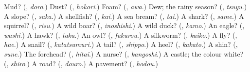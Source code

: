 \begin{tcolorbox}[breakable,colback=teal!4,colframe=teal!35!black,title={Before you move on}]
Mud? (\textbf{}, \emph{doro}.) Dust? (\textbf{}, \emph{hokori}.) Foam? (\textbf{}, \emph{awa}.) Dew; the rainy season? (\textbf{}, \emph{tsuyu}.) A slope? (\textbf{}, \emph{saka}.) A shellfish? (\textbf{}, \emph{kai}.) A sea bream? (\textbf{}, \emph{tai}.) A shark? (\textbf{}, \emph{same}.) A squirrel? (\textbf{}, \emph{risu}.) A wild boar? (\textbf{}, \emph{inoshishi}.) A wild duck? (\textbf{}, \emph{kamo}.) An eagle? (\textbf{}, \emph{washi}.) A hawk? (\textbf{}, \emph{taka}.) An owl? (\textbf{}, \emph{fukurou}.) A silkworm? (\textbf{}, \emph{kaiko}.) A fly? (\textbf{}, \emph{hae}.) A snail? (\textbf{}, \emph{katatsumuri}.) A tail? (\textbf{}, \emph{shippo}.) A heel? (\textbf{}, \emph{kakato}.) A shin? (\textbf{}, \emph{sune}.) The forehead? (\textbf{}, \emph{hitai}.) A nurse? (\textbf{}, \emph{kangoshi}.) A castle; the colour white? (\textbf{}, \emph{shiro}.) A road? (\textbf{}, \emph{douro}.) A pavement? (\textbf{}, \emph{hodou}.)
\end{tcolorbox}
